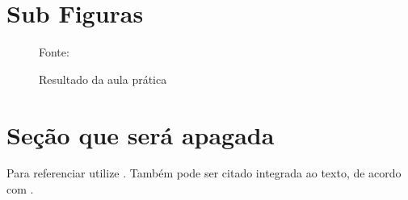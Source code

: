 \section{Sub Figuras}

\begin{figure}[H] %
  \center
  \caption{Resultado da aula prática}
  \label{fig:ap1_cod_vigual1}

  \raggedright{\fontsize{10pt}{\baselineskip}\selectfont Fonte: }

\end{figure}

\section{Seção que será apagada}

Para referenciar utilize \cite{ninguem2022curioso}. Também pode ser citado integrada ao texto, de acordo com .

